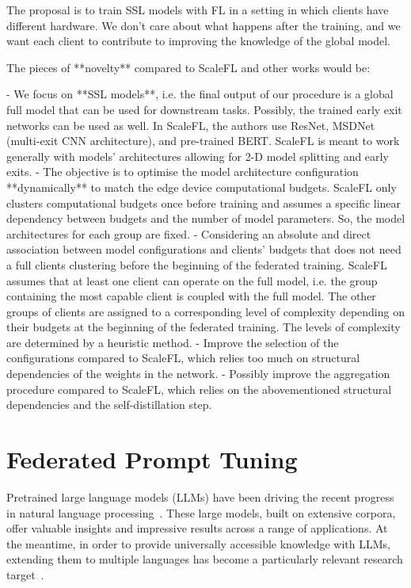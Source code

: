 \documentclass[withindex,glossary,firstyr]{cam-thesis}
\begin{document}
The proposal is to train SSL models with FL in a setting in which clients have different hardware. We don’t care about what happens after the training, and we want each client to contribute to improving the knowledge of the global model.

The pieces of **novelty** compared to ScaleFL and other works would be:

- We focus on **SSL models**, i.e. the final output of our procedure is a global full model that can be used for downstream tasks. Possibly, the trained early exit networks can be used as well. In ScaleFL, the authors use ResNet, MSDNet (multi-exit CNN architecture), and pre-trained BERT. ScaleFL is meant to work generally with models’ architectures allowing for 2-D model splitting and early exits.
- The objective is to optimise the model architecture configuration **dynamically** to match the edge device computational budgets. ScaleFL only clusters computational budgets once before training and assumes a specific linear dependency between budgets and the number of model parameters. So, the model architectures for each group are fixed.
- Considering an absolute and direct association between model configurations and clients’ budgets that does not need a full clients clustering before the beginning of the federated training. ScaleFL assumes that at least one client can operate on the full model, i.e. the group containing the most capable client is coupled with the full model. The other groups of clients are assigned to a corresponding level of complexity depending on their budgets at the beginning of the federated training. The levels of complexity are determined by a heuristic method.
- Improve the selection of the configurations compared to ScaleFL, which relies too much on structural dependencies of the weights in the network.
- Possibly improve the aggregation procedure compared to ScaleFL, which relies on the abovementioned structural dependencies and the self-distillation step.



\section{Federated Prompt Tuning}

Pretrained large language models (LLMs) have been driving the recent progress in natural language processing~\citep{brown2020language,chowdhery2022palm,anil2023palm,touvron2023llama,touvron2023llama2}. These large models, built on extensive corpora, offer valuable insights and impressive results across a range of applications. At the meantime, in order to provide universally accessible knowledge with LLMs, extending them to multiple languages has become a particularly relevant research target~\citep{XLM,XLM-R,artetxe-etal-2020-cross,pfeiffer-etal-2020-mad}. 
\end{document}
